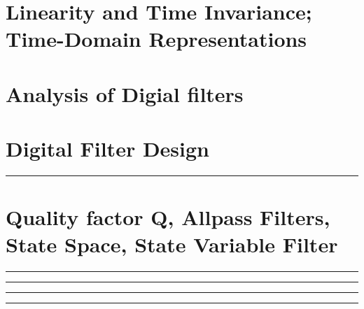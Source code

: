 \documentclass[10pt]{article}
\begin{document}
\newcommand{\josquote}[1]{
    \framebox{
    \parbox{\textwidth}{
    \textit{#1}
    }
    }
}

\newcommand{\paulhint}[1]{
    #1
}

\setlength\parindent{0pt}
\section{Linearity and Time Invariance; Time-Domain Representations}
%
%
%
%
%
\section{Analysis of Digial filters}
%
%
%
%
%
\section{Digital Filter Design}
%
%
%
%
%
%

\noindent\rule[0.5ex]{\linewidth}{0.5pt}
\section{Quality factor Q, Allpass Filters, State Space, State Variable Filter}
%
%
%
%
%
%
%
\noindent\rule[0.5ex]{\linewidth}{0.5pt}

\noindent\rule[0.5ex]{\linewidth}{0.5pt}

\noindent\rule[0.5ex]{\linewidth}{0.5pt}

\noindent\rule[0.5ex]{\linewidth}{0.5pt}

\end{document}
